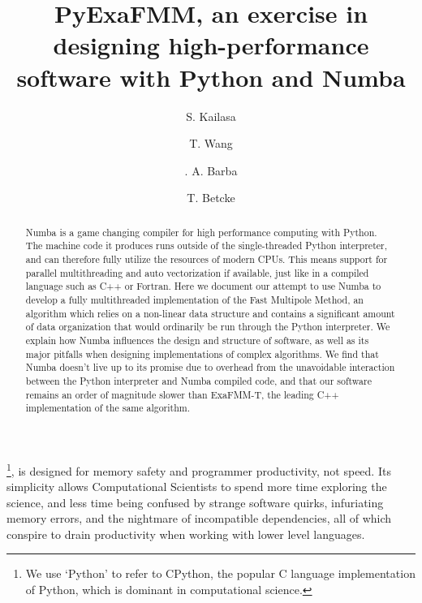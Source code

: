 \documentclass{IEEEcsmag}
\begin{document}

\title{PyExaFMM, an exercise in designing high-performance software with Python and Numba}

\author{S. Kailasa}

\author{T. Wang}

\author{. A. Barba}

\author{T. Betcke}


\begin{abstract}
    Numba is a game changing compiler for high performance computing with Python. The machine code it produces runs outside of the single-threaded Python interpreter, and can therefore fully utilize the resources of modern CPUs. This means support for parallel multithreading and auto vectorization if available, just like in a compiled language such as C++ or Fortran. Here we document our attempt to use Numba to develop a fully multithreaded implementation of the Fast Multipole Method, an algorithm which relies on a non-linear data structure and contains a significant amount of data organization that would ordinarily be run through the Python interpreter. We explain how Numba influences the design and structure of software, as well as its major pitfalls when designing implementations of complex algorithms. We find that Numba doesn't live up to its promise due to overhead from the unavoidable interaction between the Python interpreter and Numba compiled code, and that our software remains an order of magnitude slower than ExaFMM-T, the leading C++ implementation of the same algorithm.
\end{abstract}

\maketitle
{}\footnote{We use `Python' to refer to CPython, the popular C language implementation of Python, which is dominant in computational science.}, is designed for memory safety and programmer productivity, not speed. Its simplicity allows Computational Scientists to spend more time exploring the science, and less time being confused by strange software quirks, infuriating memory errors, and the nightmare of incompatible dependencies, all of which conspire to drain productivity when working with lower level languages.
\end{document}
